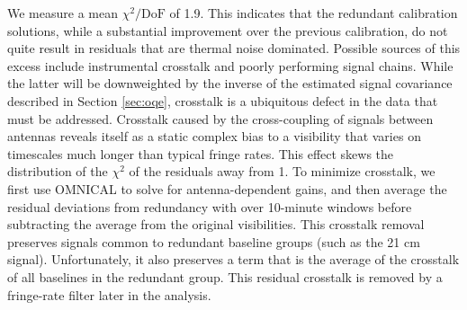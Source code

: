 \documentclass[twocolumn,numberedappendix]{emulateapj} \shorttitle{PSA64}
\begin{document}
We measure a mean $\chi^{2}/\text{DoF}$ of 1.9.  This
indicates that the redundant calibration solutions, while a substantial improvement
over the previous calibration, do not quite result in residuals that are thermal noise dominated.
Possible sources of this excess include instrumental crosstalk and poorly performing signal chains.
While the latter will be downweighted by the inverse of the estimated signal covariance described
in Section \ref{sec:oqe}, crosstalk is a ubiquitous defect in the data that must be addressed.
Crosstalk caused by the cross-coupling of signals between antennas
reveals itself as a static complex bias to a
visibility that varies on timescales much longer than typical fringe rates.
This effect 
skews the distribution of the $\chi^2$ of the residuals away from 1.
To minimize crosstalk, we first use OMNICAL to solve for antenna-dependent gains,
and then average the residual deviations from redundancy with
over 10-minute windows before subtracting
the average from the original visibilities. This
crosstalk removal preserves signals common to redundant baseline groups (such as the 21 cm signal).
Unfortunately, it also preserves a term that is the average of the crosstalk of all baselines
in the redundant group.  This residual crosstalk is removed by a fringe-rate filter later
in the analysis.
\end{document}
